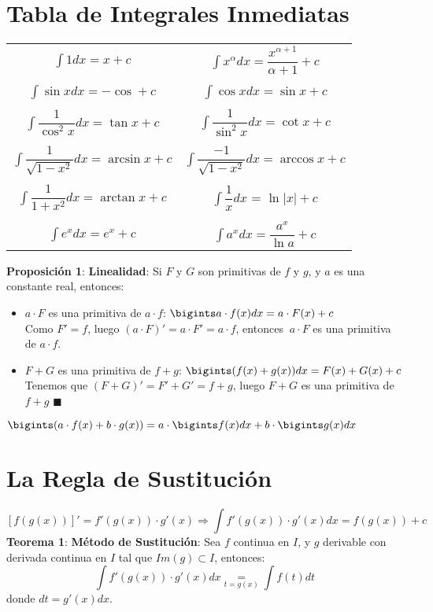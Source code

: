 \documentclass[11pt,a4paper]{article}
\newcommand*{\QEDA}{\null\nobreak\hfill\ensuremath{\blacksquare}}
\begin{document}
\section{Tabla de Integrales Inmediatas}
\begin{table}[h]
\centering
\begin{tabular}{cc}
$\int 1dx = x + c$ &
$\int x^\alpha dx = \dfrac{x^{\alpha+1}}{\alpha+1}+ c$ \\ \\
$\int \sin xdx = -\cos + c$ & 
$\int \cos x dx = \sin x + c$\\ \\
$\int \dfrac{1}{\cos^2 x} dx = \tan x + c$ & 
$\int \dfrac{1}{\sin^2 x} dx = \cot x + c$\\ \\
$\int \dfrac{1}{\sqrt{1 - x^2}} dx = \arcsin x + c$ & 
$\int \dfrac{-1}{\sqrt{1 - x^2}} dx = \arccos x + c$ \\ \\
$\int \dfrac{1}{1 + x^2} dx = \arctan x + c$ &
$\int \dfrac{1}{x} dx$ = $\ln|x| + c$ \\ \\
$\int e^xdx = e^x+c$ &
$\int a^xdx = \dfrac{a^x}{\ln a} + c$
\end{tabular}
\end{table}

\textbf{Proposici\'on 1}: \textbf{Linealidad}: Si $F$ y $G$ son primitivas de $f$ y $g$, y $a$ es una constante real, entonces:
\begin{itemize}
\item $a \cdot F$ es una primitiva de $a \cdot f$: $\bigints a \cdot f(x)dx = a \cdot F(x)+c$\\
Como $F' = f$, luego $(a\cdot F)'=a\cdot F' = a\cdot f$, entonces $\ a \cdot F$ es una primitiva de $a \cdot f$.
\item $F + G$ es una primitiva de $f+g$: $\bigints (f(x)+g(x))dx = F(x)+G(x)+c$\\
Tenemos que $(F+G)' = F'+G' = f+g$, luego $F+G$ es una primitiva de $f+g$ \QEDA\\
\end{itemize}
\begin{center}
$\bigints(a \cdot f(x) + b \cdot g(x)) = a \cdot \bigints f(x) dx + b \cdot \bigints g(x) dx$
\end{center}

\section{La Regla de Sustituci\'on}
$$\left[ f(g(x)) \right]' = f'(g(x)) \cdot g'(x) \Rightarrow \int f'(g(x)) \cdot g'(x) dx = f(g(x))+c $$
\textbf{Teorema 1}: \textbf{M\'etodo de Sustituci\'on}: Sea $f$ continua en $I$, y $g$ derivable con derivada continua en $I$ tal que $Im(g) \subset I$, entonces: $$\int f'(g(x))\cdot g'(x) dx \underset{t=g(x)}{=} \int f(t)dt$$
donde $dt = g'(x)dx$.\\
\end{document}
